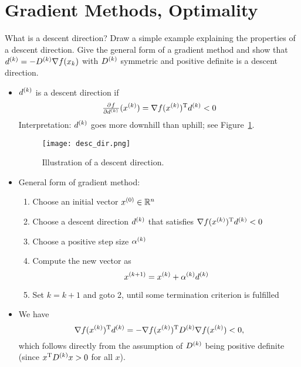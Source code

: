 \documentclass{article}
\begin{document}
\section{Gradient Methods, Optimality}

\begin{question}
  What is a descent direction? Draw a simple example explaining the properties of a descent
  direction. Give the general form of a gradient method and show that
  \(\kth{d} = -\kth{D} \nabla f(x_k)\) with \(\kth{D}\) symmetric and positive definite is a descent
  direction.
\end{question}
\begin{itemize}
\item \(\kth{d}\) is a descent direction if
  \begin{equation*}
    \pd{f}{{\kth{d}}}(\kth{x}) = \T{\nabla f(\kth{x})} \kth{d} < 0
  \end{equation*}
  Interpretation: \(\kth{d}\) goes more downhill than uphill; see Figure~\ref{fig:desc_dir}.
  \begin{figure}[H]
    \centering
    \texttt{[image: desc\_dir.png]}
    \caption{Illustration of a descent direction.\label{fig:desc_dir}}
  \end{figure}
\item General form of gradient method:
  \begin{enumerate}
  \item Choose an initial vector \(\kth[0]{x} \in \RR^n\)
  \item Choose a descent direction \(\kth{d}\) that satisfies \(\T{\nabla f(\kth{x})} \kth{d} < 0\)
  \item Choose a positive step size \(\kth{\alpha}\)
  \item Compute the new vector as
  \begin{equation*}
    \kth[k+1]{x} = \kth{x} + \kth{\alpha} \kth{d}
  \end{equation*}
  \item Set \(k = k + 1\) and goto 2, until some termination criterion is fulfilled
\end{enumerate}
\item We have
  \begin{equation*}
    \T{\nabla f(\kth{x})} \kth{d} = -\T{\nabla f(\kth{x})} \kth{D} \nabla f(\kth{x}) < 0,
  \end{equation*}
  which follows directly from the assumption of \(\kth{D}\) being positive definite (since
  \(\T{x}\kth{D}x > 0\) for all \(x\)). 
\end{itemize}
\end{document}
